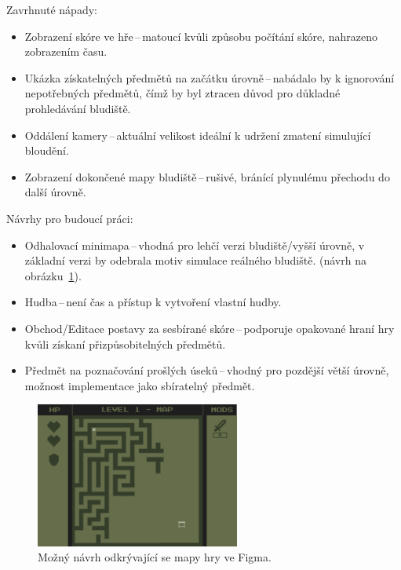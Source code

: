 \noindent Zavrhnuté nápady:
\begin{itemize}
    \item Zobrazení skóre ve hře\,--\,matoucí kvůli způsobu počítání skóre, nahrazeno zobrazením času.
    \item  Ukázka získatelných předmětů na začátku úrovně\,--\,nabádalo by k ignorování nepotřebných předmětů, čímž by byl ztracen důvod pro důkladné prohledávání bludiště.
    \item  Oddálení kamery\,--\,aktuální velikost ideální k udržení zmatení simulující bloudění.
    \item Zobrazení dokončené mapy bludiště\,--\,rušivé, bránící plynulému přechodu do další úrovně.
\end{itemize}

\noindent Návrhy pro budoucí práci:
\begin{itemize}
    \item Odhalovací minimapa\,--\,vhodná pro lehčí verzi bludiště/vyšší úrovně, v základní verzi by odebrala motiv simulace reálného bludiště.
    (návrh na obrázku~\ref{fig:map_idea}).
    \item Hudba\,--\,není čas a přístup k vytvoření vlastní hudby.
    \item Obchod/Editace postavy za sesbírané skóre\,--\,podporuje opakované hraní hry kvůli získaní přizpůsobitelných předmětů.
    \item  Předmět na poznačování prošlých úseků\,--\,vhodný pro pozdější větší úrovně, možnost implementace jako sbíratelný předmět.
\end{itemize}

\begin{figure}[H]
    \centering
    \includegraphics[width=0.6\textwidth, height=0.26\textheight]{obrazky-figures/ch5/Game_screen-MAP.png}
    \caption{Možný návrh odkrývající se mapy hry ve Figma.}
    \label{fig:map_idea}
\end{figure}

